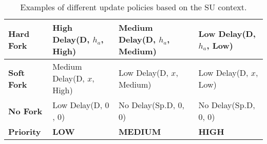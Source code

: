 
\begin{table}[h!]
\centering
\begin{tabu} to 1.0\textwidth {||X[0.5l] | X[l] | X[l] | X[l] ||}
\hline
\textbf{Hard Fork} & High Delay\newline(D, $h_a$, High) & Medium Delay\newline(D, $h_a$, Medium) & Low Delay\newline(D, $h_a$, Low) \\
\hline
\textbf{Soft Fork} & Medium Delay\newline(D, $x$, High) & Low Delay\newline(D, $x$, Medium) & Low Delay\newline(D, $x$, Low) \\
\hline
\textbf{No Fork} & Low Delay\newline(D, $0$, $0$) & No Delay\newline(Sp.D, $0$, $0$) & No Delay\newline(Sp.D, $0$, $0$) \\
\hline
\textbf{Priority} & \textbf{LOW}  & \textbf{MEDIUM} & \textbf{HIGH} \\
\hline
\end{tabu}
\caption{Examples of different update policies based on the SU context.}
\label{update-policies2-table}
\end{table}


